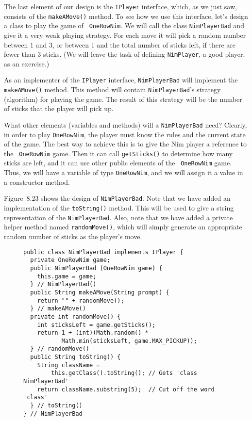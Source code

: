The last element of our design is the {\tt IPlayer} interface, which,
as we just saw, consists of the {\tt makeAMove()} method.  To see how
we use this interface, let's design a class to play the game of {\tt
OneRowNim}.  We will call the class {\tt NimPlayerBad} and give it a
very weak playing strategy. For each move it will pick a random number
between 1 and 3, or between 1 and the total number of sticks left, if
there are fewer than 3 sticks.  (We will leave the task of defining
{\tt NimPlayer}, a good player, as an exercise.)

As an implementer of the {\tt IPlayer} interface, {\tt NimPlayerBad}
will implement the {\tt makeAMove()} method. This method will contain
{\tt NimPlayerBad}'s strategy (algorithm) for playing the game.  The
result of this strategy will be the number of sticks that the player
will pick up.

What other elements (variables and methods) will a {\tt NimPlayerBad}
need?  Clearly, in order to play {\tt OneRowNim}, the player must know
the rules and the current state of the game.  The best way
to achieve this is to give the Nim player a reference to the {\tt
OneRowNim} game.  Then it can call {\tt getSticks()} to determine how
many sticks are left, and it can use other public elements of the {\tt
OneRowNim} game. Thus, we will have a variable of type {\tt OneRowNim},
and we will assign it a value in a constructor method.

Figure~8.23 shows the design of {\tt NimPlayerBad}. Note that we have
added an implementation of the {\tt toString()} method.  This will
be used to give a string representation of the {\tt NimPlayerBad}.
Also, note that we have added a private helper method named
{\tt randomMove()}, which will simply generate an appropriate
random number of sticks as the player's move.

\begin{figure}[h]
\jjjprogstart
\begin{jjjlisting}[28pc]
\begin{lstlisting}
public class NimPlayerBad implements IPlayer {   
  private OneRowNim game;
  public NimPlayerBad (OneRowNim game) {  
    this.game = game;
  } // NimPlayerBad()
  public String makeAMove(String prompt) {   
    return "" + randomMove();
  } // makeAMove()
  private int randomMove() {   
    int sticksLeft = game.getSticks();
    return 1 + (int)(Math.random() * 
           Math.min(sticksLeft, game.MAX_PICKUP));
  } // randomMove()
  public String toString() { 
    String className = 
        this.getClass().toString(); // Gets 'class NimPlayerBad'
    return className.substring(5);  // Cut off the word 'class'
  } // toString()
} // NimPlayerBad
\end{lstlisting}
\end{jjjlisting}
\end{figure}

